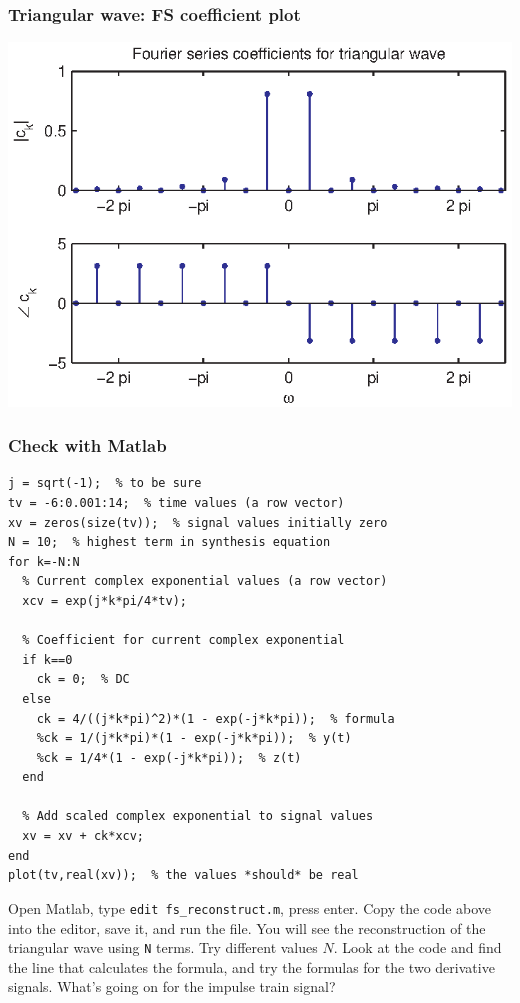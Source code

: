 \documentclass[10pt]{beamer}
\begin{document}
\begin{frame}
\frametitle{Triangular wave:  FS coefficient plot}

\begin{center}
  \includegraphics{fs_add_fig06}
\end{center}
\end{frame}

\begin{frame}[fragile,shrink=20]
\frametitle{Check with Matlab}
\begin{verbatim}
j = sqrt(-1);  % to be sure
tv = -6:0.001:14;  % time values (a row vector)
xv = zeros(size(tv));  % signal values initially zero
N = 10;  % highest term in synthesis equation
for k=-N:N
  % Current complex exponential values (a row vector)
  xcv = exp(j*k*pi/4*tv);
  
  % Coefficient for current complex exponential
  if k==0
    ck = 0;  % DC
  else
    ck = 4/((j*k*pi)^2)*(1 - exp(-j*k*pi));  % formula
    %ck = 1/(j*k*pi)*(1 - exp(-j*k*pi));  % y(t)
    %ck = 1/4*(1 - exp(-j*k*pi));  % z(t)
  end
  
  % Add scaled complex exponential to signal values
  xv = xv + ck*xcv;
end
plot(tv,real(xv));  % the values *should* be real
\end{verbatim}
\end{frame}

Open Matlab, type {\tt edit fs\_reconstruct.m}, press enter.
Copy the code above into the editor, save it, and run the file.  You will see the 
reconstruction of the triangular wave using {\tt N} terms.  Try different values 
$N$.  Look at the code and find the line that calculates the formula, and try the
formulas for the two derivative signals.  What's going on for the impulse train
signal?
\end{document}
